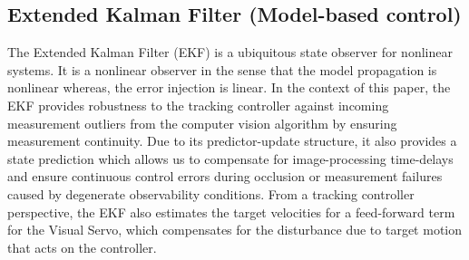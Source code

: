 %	
%
%
\subsection{Extended Kalman Filter (Model-based control)}
The Extended Kalman Filter (EKF) is a ubiquitous state observer for nonlinear systems. It is a nonlinear observer in the sense that the model propagation is nonlinear whereas, the error injection is linear. In the context of this paper, the EKF provides robustness to the tracking controller against incoming measurement outliers from the computer vision algorithm by ensuring measurement continuity. Due to its predictor-update structure, it also provides a state prediction which allows us to compensate for image-processing time-delays and ensure continuous control errors during occlusion or measurement failures caused by degenerate observability conditions. From a tracking controller perspective, the EKF also estimates the target velocities for a feed-forward term for the Visual Servo, which compensates for the disturbance due to target motion that acts on the controller.

